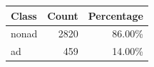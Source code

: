\begin{tabular}{lrr}
\toprule
Class & Count & Percentage
\\
\midrule
nonad & 2820 & 86.00\%
\\
ad & 459 & 14.00\%
\\
\bottomrule
\end{tabular}

